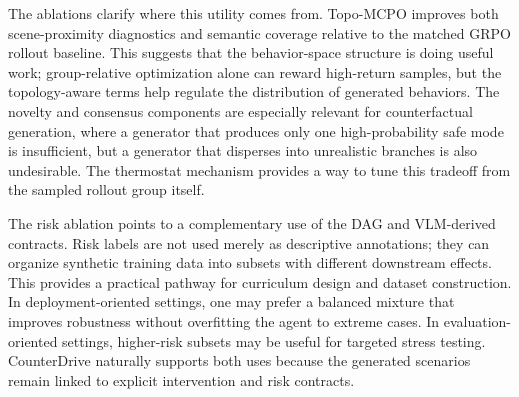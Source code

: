 \documentclass{article}
\begin{document}
The ablations clarify where this utility comes from. Topo-MCPO improves both scene-proximity diagnostics and semantic coverage relative to the matched GRPO rollout baseline. This suggests that the behavior-space structure is doing useful work; group-relative optimization alone can reward high-return samples, but the topology-aware terms help regulate the distribution of generated behaviors. The novelty and consensus components are especially relevant for counterfactual generation, where a generator that produces only one high-probability safe mode is insufficient, but a generator that disperses into unrealistic branches is also undesirable. The thermostat mechanism provides a way to tune this tradeoff from the sampled rollout group itself.

The risk ablation points to a complementary use of the DAG and VLM-derived contracts. Risk labels are not used merely as descriptive annotations; they can organize synthetic training data into subsets with different downstream effects. This provides a practical pathway for curriculum design and dataset construction. In deployment-oriented settings, one may prefer a balanced mixture that improves robustness without overfitting the agent to extreme cases. In evaluation-oriented settings, higher-risk subsets may be useful for targeted stress testing. CounterDrive naturally supports both uses because the generated scenarios remain linked to explicit intervention and risk contracts.

\end{document}

